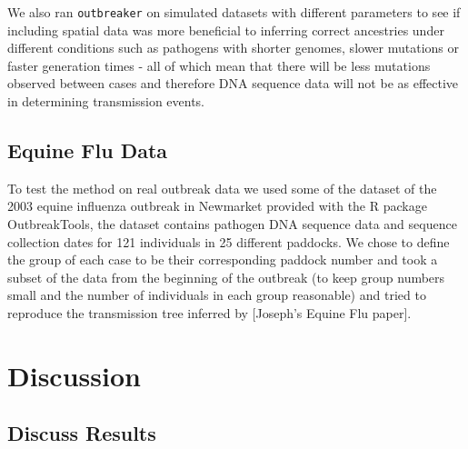 \documentclass[11pt,a4paper]{report}
\begin{document}
We also ran {\tt outbreaker} on simulated datasets with different parameters to see if including spatial data was more beneficial to inferring correct ancestries under different conditions such as pathogens with shorter genomes, slower mutations or faster generation times - all of which mean that there will be less mutations observed between cases and therefore DNA sequence data will not be as effective in determining transmission events.



\section{Equine Flu Data}
To test the method on real outbreak data we used some of the dataset of the 2003 equine influenza outbreak in Newmarket provided with the R package OutbreakTools, the dataset contains pathogen DNA sequence data and sequence collection dates for 121 individuals in 25 different paddocks. We chose to define the group of each case to be their corresponding paddock number and took a subset of the data from the beginning of the outbreak (to keep group numbers small and the number of individuals in each group reasonable) and tried to reproduce the transmission tree inferred by [Joseph’s Equine Flu paper].



\chapter{Discussion}
\section{Discuss Results}
\end{document}
